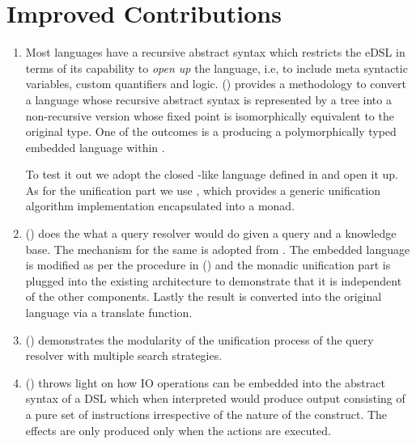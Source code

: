 \documentclass[thesis-solanki.tex]{subfiles}
\begin{document}
\section{Improved Contributions}
\begin{enumerate}
\item
  Most languages have a recursive abstract syntax which restricts the eDSL
  in terms of its capability to \textit{open up} the language, i.e, to include meta syntactic
  variables, custom quantifiers and logic.
  () provides a methodology to convert a language whose recursive abstract
  syntax is represented by a tree into a non-recursive version whose fixed point is isomorphically equivalent to
  the original type.
  One of the outcomes is a producing a polymorphically typed embedded language within .

  To test it out we adopt the closed -like language defined in \cite{prolog-lib} and open it up.
  As for the unification part we use \cite{unification-fd-lib}, which provides a generic unification algorithm
  implementation encapsulated into a monad.

\item
  () does the what a  query resolver would do given a
  query and a knowledge base.
  The mechanism for the same is adopted from \cite{prolog-lib}.
  The embedded language is modified as per the procedure in () and the
  monadic unification part is plugged into the existing architecture to demonstrate that it is independent of the
  other components.
  Lastly the result is converted into the original language via a translate function.

\item
  () demonstrates the modularity of the unification process of the query
  resolver with multiple search strategies.

\item
  () throws light on how IO operations can be embedded into the abstract
  syntax of a DSL which when interpreted would produce output consisting of a pure set of instructions irrespective
  of the nature of the construct.
  The effects are only produced only when the actions are executed.
\end{enumerate}
\end{document}
